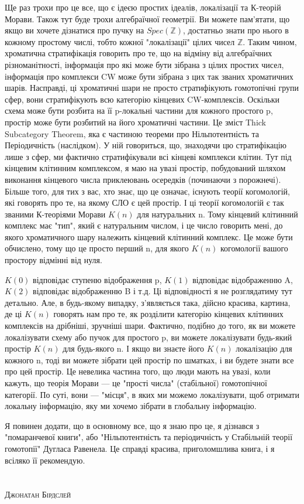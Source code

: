 Ще раз трохи про це все, що є ідеєю простих ідеалів, локалізації
та К-теорій Морави. Також тут буде трохи алгебраїчної геометрії.
Ви можете пам'ятати, що якщо ви хочете дізнатися про пучку на $Spec(\mathbb{Z})$,
достатньо знати про нього в кожному простому числі, тобто кожної "локалізації" 
цілих чисел $\mathbb{Z}$. Таким чином, хроматична стратифікація говорить про те,
що на відміну від алгебраїчних різноманітності, інформація про які може
бути зібрана з цілих простих чисел, інформація про комплекси CW може бути
зібрана з цих так званих хроматичних шарів. Насправді, ці хроматичні шари
не просто стратифікують гомотопічні групи сфер, вони стратифікують всю
категорію кінцевих CW-комплексів. Оскільки схема може бути розбита на
її p-локальні частини для кожного простого p, простір може бути розбитий
на його хроматичні частини. Це зміст Thick Subcategory Theorem, яка є
частиною теореми про Нільпотентність та Періодичність (наслідком).
У ній говориться, що, знаходячи цю стратифікацію лише з сфер, ми фактично
стратифікували всі кінцеві комплекси клітин. Тут під кінцевим клітинним
комплексом, я маю на увазі простір, побудований шляхом виконання кінцевого
числа приклеювань осередків (починаючи з порожнечі). Більше того, для тих
з вас, хто знає, що це означає, існують теорії когомологій, які говорять
про те, на якому СЛО є цей простір. І ці теорії когомологій є так званими
К-теоріями Морави $K(n)$ для натуральних n. Тому кінцевий клітинний
комплекс має "тип", який є натуральним числом, і це число говорить
мені, до якого хроматичного шару належить кінцевий клітинний комплекс.
Це може бути обчислено, тому що це просто перший n, для якого $K(n)$
когомології вашого простору відмінні від нуля.

$K(0)$ відповідає ступеню відображення p, $K(1)$ відповідає відображенню A, $K(2)$
відповідає відображенню B і т.д. Ці відповідності я не розглядатиму
тут детально. Але, в будь-якому випадку, з'являється така, дійсно
красива, картина, де ці $K(n)$ говорять нам про те, як розділити
категорію кінцевих клітинних комплексів на дрібніші, зручніші шари.
Фактично, подібно до того, як ви можете локалізувати схему або пучок
для простого p, ви можете локалізувати будь-який простір $K(n)$ для
будь-якого n. І якщо ви знаєте його $K(n)$ локалізацію для кожного n,
тоді ви можете зібрати цей простір по шматках, і ви будете знати все
про цей простір. Це невелика частина того, що люди мають на увазі,
коли кажуть, що теорія Морави --- це "прості числа" (стабільної) гомотопічної
категорії. По суті, вони --- "місця", в яких ми можемо локалізувати, щоб
отримати локальну інформацію, яку ми хочемо зібрати в глобальну інформацію.

Я повинен додати, що в основному все, що я знаю про це, я дізнався
з "помаранчевої книги", або "Нільпотентність та періодичність у Стабільній
теорії гомотопії" Дугласа Равенела. Це справді красива, приголомшлива книга,
і я всіляко її рекомендую.
\\
\\
\\
\textsc{\footnotesize Джонатан Бірдслей}
